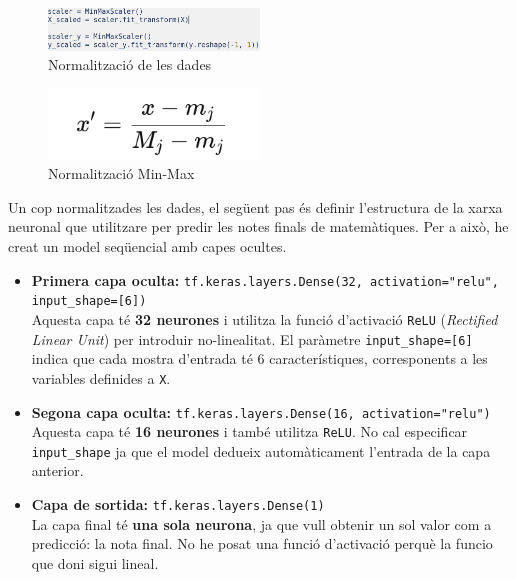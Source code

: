 \begin{figure}[H]
    \centering
    \includegraphics[width=0.5\textwidth]{./figures/24.png}
    \caption{Normalització de les dades}
\end{figure}

\begin{figure}[H]
    \centering
    \includegraphics[width=0.5\textwidth]{./figures/25.png}
    \caption{Normalització Min-Max}
\end{figure}


Un cop normalitzades les dades, el següent pas és definir l’estructura de la xarxa neuronal que utilitzare per predir les notes finals de matemàtiques. Per a això, he creat un model seqüencial amb capes ocultes.

\begin{itemize}
    \item \textbf{Primera capa oculta:} \texttt{tf.keras.layers.Dense(32, activation="relu", input\_shape=[6])} \\
    Aquesta capa té \textbf{32 neurones} i utilitza la funció d’activació \texttt{ReLU} (\textit{Rectified Linear Unit}) per introduir no-linealitat. El paràmetre \texttt{input\_shape=[6]} indica que cada mostra d’entrada té 6 característiques, corresponents a les variables definides a \texttt{X}.

    \item \textbf{Segona capa oculta:} \texttt{tf.keras.layers.Dense(16, activation="relu")} \\
    Aquesta capa té \textbf{16 neurones} i també utilitza \texttt{ReLU}. No cal especificar \texttt{input\_shape} ja que el model dedueix automàticament l’entrada de la capa anterior.

    \item \textbf{Capa de sortida:} \texttt{tf.keras.layers.Dense(1)} \\
    La capa final té \textbf{una sola neurona}, ja que vull obtenir un sol valor com a predicció: la nota final. No he posat una funció d'activació perquè la funcio que doni sigui lineal.
\end{itemize}

